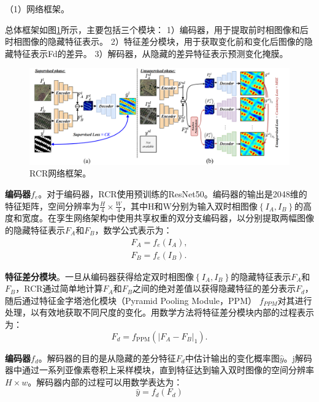 \documentclass[lang=chs, degree=master, blindreview=false, adobe=false]{yanputhesis}
\begin{document}
（1）网络框架。

总体框架如图\ref{fig:RCRfram}所示，主要包括三个模块：
1）编码器，用于提取前时相图像和后时相图像的隐藏特征表示。
2）特征差分模块，用于获取变化前和变化后图像的隐藏特征表示Fd的差异。
3）解码器，从隐藏的差异特征表示预测变化掩膜。
\begin{figure}[htb]
  \centering
  \includegraphics[scale=0.5]{images/RCRframe.png}
  \caption{
    RCR网络框架\cite{bandara2022RCR}。
  }
  \label{fig:RCRfram}
\end{figure}

\textbf{编码器$f_{e}$}。对于编码器，RCR使用预训练的ResNet50\cite{He2015ResNet}。编码器的输出是2048维的特征矩阵，空间分辨率为$\frac{H}{4} \times \frac{W}{4}$，其中H和W分别为输入双时相图像$\left \{ I_A, I_B \right \} $的高度和宽度。在孪生网络架构中使用共享权重的双分支编码器，以分别提取两幅图像的隐藏特征表示$F_A$和$F_B$，数学公式表示为：
\begin{equation}
  \label{eq:RCRencode}
\begin{array}{l}
  F_{A}=f_{e}\left(I_{A}\right), \\
  F_{B}=f_{e}\left(I_{B}\right) .
  \end{array}
\end{equation}

\textbf{特征差分模块}。一旦从编码器获得给定双时相图像$\left \{ I_A, I_B \right \} $的隐藏特征表示$F_A$和$F_B$，RCR通过简单地计算$F_A$和$F_B$之间的绝对差值以获得隐藏特征的差分表示$F_d$，随后通过特征金字塔池化模块（Pyramid Pooling Module，PPM）\cite{zhao2017PPM} $f_{PPM}$对其进行处理，以有效地获取不同尺度的变化。用数学方法将特征差分模块内部的过程表示为：
\begin{equation}
  \label{eq:RCRppm}
  F_{d}=f_{\mathrm{PPM}}\left(\left|F_{A}-F_{B}\right|_{1}\right) .
\end{equation}

\textbf{编码器$f_{d}$}。解码器的目的是从隐藏的差分特征$F_d$中估计输出的变化概率图$\hat{y} $。j解码器中通过一系列亚像素卷积上采样模块\cite{shi2016upsample}，直到特征达到输入双时图像的空间分辨率$H \times w$。解码器内部的过程可以用数学表达为：
\begin{equation}
  \label{eq:RCRdecode}
  \hat{y}=f_{d}\left(F_{d}\right)
\end{equation}
\end{document}
